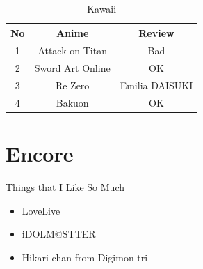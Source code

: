\documentclass{article}
\begin{document}
\begin{table}[htb]
	\caption{Kawaii}
	\label{tab:kawaii}
\begin{center}
\begin{tabular}{||c|c|c||}
	\hline
No & Anime & Review \\
	\hline\hline
1 & Attack on Titan & Bad \\
	\hline
2 & Sword Art Online & OK \\
	\hline
3 & Re Zero & Emilia DAISUKI \\
	\hline
4 & Bakuon & OK \\
	\hline
\end{tabular}
\end{center}
\end{table}

\section{Encore}
Things that I Like So Much
\begin{itemize}
\item LoveLive
\item iDOLM@STTER
\item Hikari-chan from Digimon tri
\end{itemize}

\nocite{*}


\end{document}

